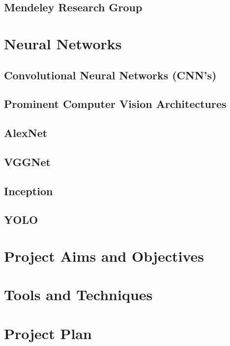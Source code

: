 \documentclass[12pt, twoside, a4paper]{article}
\begin{document}
\subsection{Mendeley Research Group}
\clearpage

\section{Neural Networks}
\subsection{Convolutional Neural Networks (CNN's)}
\subsection{Prominent Computer Vision Architectures}
\subsection{AlexNet}
\subsection{VGGNet}
\subsection{Inception}
\subsection{YOLO}
\clearpage

\section{Project Aims and Objectives}
\clearpage

\section{Tools and Techniques}
\clearpage

\section{Project Plan}
\clearpage

\printbibliography
{}
\end{document}
